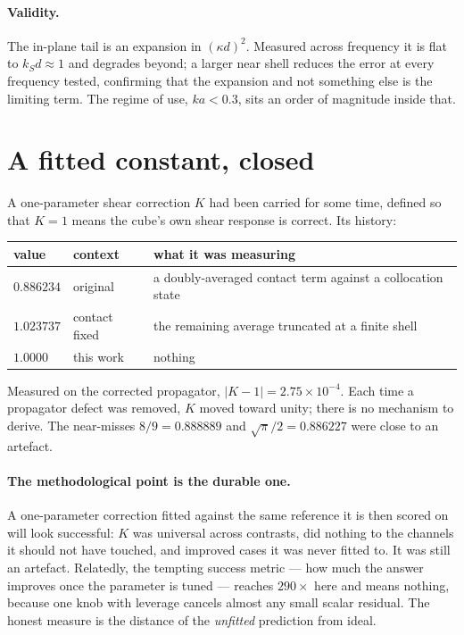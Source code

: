 \documentclass[11pt,a4paper]{article}
\begin{document}
\paragraph{Validity.} The in-plane tail is an expansion in $(\kappa d)^{2}$.
Measured across frequency it is flat to $k_Sd\approx1$ and degrades beyond;
a larger near shell reduces the error at every frequency tested, confirming that
the expansion and not something else is the limiting term. The regime of use,
$ka<0.3$, sits an order of magnitude inside that.

\section{A fitted constant, closed}

A one-parameter shear correction $K$ had been carried for some time, defined so
that $K=1$ means the cube's own shear response is correct. Its history:
%
\begin{center}
\begin{tabular}{lll}
\toprule
value & context & what it was measuring\\
\midrule
$0.886234$ & original & a doubly-averaged contact term against a collocation state\\
$1.023737$ & contact fixed & the remaining average truncated at a finite shell\\
$1.0000$   & this work & nothing\\
\bottomrule
\end{tabular}
\end{center}
%
Measured on the corrected propagator, $|K-1| = 2.75\times10^{-4}$. Each time a
propagator defect was removed, $K$ moved toward unity; there is no mechanism to
derive. The near-misses $8/9 = 0.888889$ and $\sqrt{\pi}/2 = 0.886227$ were
close to an artefact.

\paragraph{The methodological point is the durable one.} A one-parameter
correction fitted against the same reference it is then scored on will look
successful: $K$ was universal across contrasts, did nothing to the channels it
should not have touched, and improved cases it was never fitted to. It was still
an artefact. Relatedly, the tempting success metric --- how much the answer
improves once the parameter is tuned --- reaches $290\times$ here and means
nothing, because one knob with leverage cancels almost any small scalar
residual. The honest measure is the distance of the \emph{unfitted} prediction
from ideal.
\end{document}
